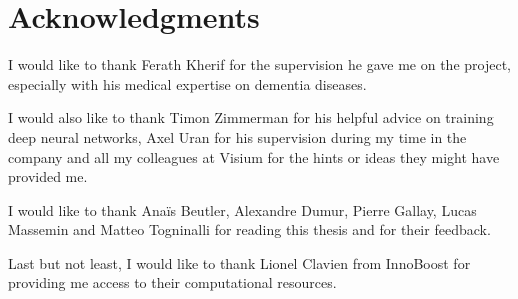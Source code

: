 \chapter{Acknowledgments}
I would like to thank Ferath Kherif for the supervision he gave me on the project, especially with his medical expertise on dementia diseases.

I would also like to thank Timon Zimmerman for his helpful advice on training deep neural networks, Axel Uran for his supervision during my time in the company and all my colleagues at Visium\footnotemark{} for the hints or ideas they might have provided me.

I would like to thank Anaïs Beutler, Alexandre Dumur, Pierre Gallay, Lucas Massemin and Matteo Togninalli for reading this thesis and for their feedback.

Last but not least, I would like to thank Lionel Clavien from InnoBoost\footnotemark{} for providing me access to their computational resources.

